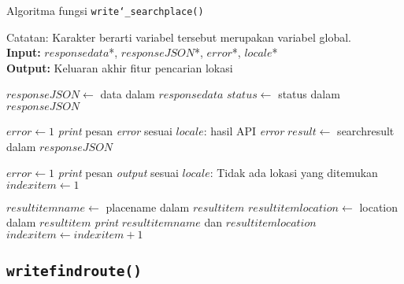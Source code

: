 \begin{algorithm}[h]
	\caption{Algoritma fungsi \texttt{write\char`_searchplace()}}
	\label{alg:design-write-searchplace}
	\vspace{-0.6\baselineskip}
	\begin{flushleft}
		Catatan: Karakter \textquotesingle *\textquotesingle\xspace berarti variabel tersebut merupakan variabel global. \\
		\textbf{Input:} $responsedata$*, $responseJSON$*, $error$*, $locale$* \\
		\textbf{Output:} Keluaran akhir fitur pencarian lokasi \\
	\end{flushleft}
	\vspace{-1.05\baselineskip}
	\begin{algorithmic}
		\State $responseJSON \gets$ data dalam $responsedata$
		\State $status \gets$ \textquotesingle\textquotesingle status\textquotesingle\textquotesingle\xspace dalam $responseJSON$
		
			\State $error \gets 1$
			\State \textit{print} pesan \textit{error} sesuai $locale$: hasil API \textit{error}
		\Else
			\State $result \gets$ \textquotesingle\textquotesingle searchresult\textquotesingle\textquotesingle\xspace dalam $responseJSON$
			
				\State $error \gets 1$
				\State \textit{print} pesan \textit{output} sesuai $locale$: Tidak ada lokasi yang ditemukan
			\Else
				\State $indexitem \gets 1$
				
				 
					\State $resultitemname \gets$ \textquotesingle\textquotesingle placename\textquotesingle\textquotesingle\xspace dalam $resultitem$
					\State $resultitemlocation \gets$ \textquotesingle\textquotesingle location\textquotesingle\textquotesingle\xspace dalam $resultitem$
					\State \textit{print} $resultitemname$ dan $resultitemlocation$
					\State $indexitem \gets indexitem + 1$
				\EndFor
			\EndIf
		\EndIf
	\end{algorithmic}
\end{algorithm}
	
\subsection{\texttt{write\textunderscore findroute()}}
\label{sec:design-code-write-findroute}

